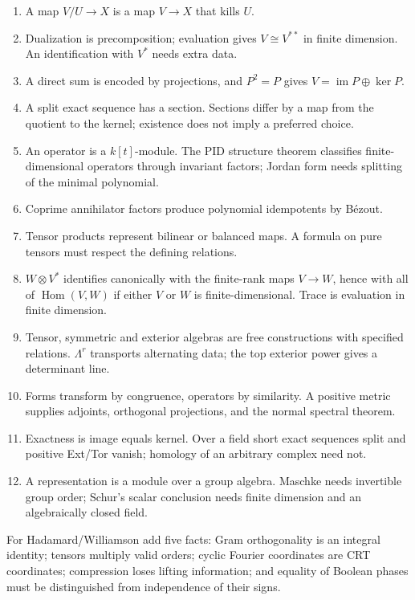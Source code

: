 \documentclass[
  11pt,
]{article}
\providecommand{\tightlist}{%
  \setlength{\itemsep}{0pt}\setlength{\parskip}{0pt}}
\begin{document}
\begin{enumerate}
\def\labelenumi{\arabic{enumi}.}
\tightlist
\item
  A map \(V/U\to X\) is a map \(V\to X\) that kills \(U\).
\item
  Dualization is precomposition; evaluation gives \(V\cong V^{**}\) in
  finite dimension. An identification with \(V^*\) needs extra data.
\item
  A direct sum is encoded by projections, and \(P^2=P\) gives
  \(V=\operatorname{im}P\oplus\ker P\).
\item
  A split exact sequence has a section. Sections differ by a map from
  the quotient to the kernel; existence does not imply a preferred
  choice.
\item
  An operator is a \(k[t]\)-module. The PID structure theorem classifies
  finite-dimensional operators through invariant factors; Jordan form
  needs splitting of the minimal polynomial.
\item
  Coprime annihilator factors produce polynomial idempotents by Bézout.
\item
  Tensor products represent bilinear or balanced maps. A formula on pure
  tensors must respect the defining relations.
\item
  \(W\otimes V^*\) identifies canonically with the finite-rank maps
  \(V\to W\), hence with all of \(\operatorname{Hom}(V,W)\) if either
  \(V\) or \(W\) is finite-dimensional. Trace is evaluation in finite
  dimension.
\item
  Tensor, symmetric and exterior algebras are free constructions with
  specified relations. \(\Lambda^r\) transports alternating data; the
  top exterior power gives a determinant line.
\item
  Forms transform by congruence, operators by similarity. A positive
  metric supplies adjoints, orthogonal projections, and the normal
  spectral theorem.
\item
  Exactness is image equals kernel. Over a field short exact sequences
  split and positive Ext/Tor vanish; homology of an arbitrary complex
  need not.
\item
  A representation is a module over a group algebra. Maschke needs
  invertible group order; Schur's scalar conclusion needs finite
  dimension and an algebraically closed field.
\end{enumerate}

For Hadamard/Williamson add five facts: Gram orthogonality is an
integral identity; tensors multiply valid orders; cyclic Fourier
coordinates are CRT coordinates; compression loses lifting information;
and equality of Boolean phases must be distinguished from independence
of their signs.
\end{document}
